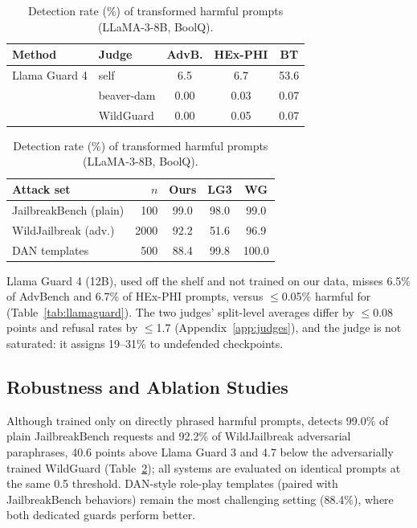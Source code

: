 \begin{table}[t]
\centering
\begin{minipage}[t]{0.52\linewidth}
\centering
\caption{Harmful rate (\%) on LLaMA-3-8B: Llama Guard 4 miss rate vs.\ \method{} (mean of 12 checkpoints, std $\leq$0.10).}
\label{tab:llamaguard}
\footnotesize
\setlength{\tabcolsep}{3pt}
\begin{tabular}{@{}llccc@{}}
\toprule
\textbf{Method} & \textbf{Judge} & \textbf{AdvB.} & \textbf{HEx-PHI} & \textbf{BT} \\
\midrule
Llama Guard 4 & self & 6.5 & 6.7 & 53.6 \\
\midrule
\multirow{2}{*}{\method{}} & beaver-dam & 0.00 & 0.03 & 0.07 \\
 & WildGuard & 0.00 & 0.05 & 0.07 \\
\bottomrule
\end{tabular}
\end{minipage}\hfill
\begin{minipage}[t]{0.45\linewidth}
\centering
\caption{Detection rate (\%) of transformed harmful prompts (LLaMA-3-8B, BoolQ).}
\label{tab:robust}
\footnotesize
\setlength{\tabcolsep}{2pt}
\begin{tabular}{@{}lrccc@{}}
\toprule
\textbf{Attack set} & $n$ & \textbf{Ours} & \textbf{LG3} & \textbf{WG} \\
\midrule
JailbreakBench (plain) & 100  & 99.0 & 98.0 & 99.0 \\
WildJailbreak (adv.)   & 2000 & 92.2 & 51.6 & 96.9 \\
DAN templates          & 500  & 88.4 & 99.8 & 100.0 \\
\bottomrule
\end{tabular}
\end{minipage}
\end{table}

 Llama Guard 4 (12B), used off the shelf and not trained on our data, misses 6.5\% of AdvBench and 6.7\% of HEx-PHI prompts, versus $\leq$0.05\% harmful for \method{} (Table~\ref{tab:llamaguard}). The two judges' split-level averages differ by $\leq$0.08 points and refusal rates by $\leq$1.7 (Appendix~\ref{app:judges}), and the judge is not saturated: it assigns 19--31\% to undefended checkpoints.

\subsection{Robustness and Ablation Studies}
\label{sec:ablations}
\label{sec:robust}
 Although trained only on directly phrased harmful prompts, \method{} detects 99.0\% of plain JailbreakBench requests and 92.2\% of WildJailbreak adversarial paraphrases, 40.6 points above Llama Guard 3 and 4.7 below the adversarially trained WildGuard (Table~\ref{tab:robust}); all systems are evaluated on identical prompts at the same 0.5 threshold. DAN-style role-play templates (paired with JailbreakBench behaviors) remain the most challenging setting (88.4\%), where both dedicated guards perform better.

